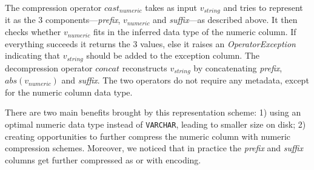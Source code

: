 The compression operator \(cast_{numeric}\) takes as input \(v_{string}\) and tries to represent it as the 3 components---\textit{prefix}, \(v_{numeric}\) and \textit{suffix}---as described above. It then checks whether \(v_{numeric}\) fits in the inferred data type of the numeric column. If everything succeeds it returns the 3 values, else it raises an \textit{OperatorException} indicating that \(v_{string}\) should be added to the exception column. The decompression operator \(concat\) reconstructs \(v_{string}\) by concatenating \textit{prefix}, \(abs(v_{numeric})\) and \textit{suffix}. The two operators do not require any metadata, except for the numeric column data type.

There are two main benefits brought by this representation scheme: 1) using an optimal numeric data type instead of \verb|VARCHAR|, leading to smaller size on disk; 2) creating opportunities to further compress the numeric column with numeric compression schemes. Moreover, we noticed that in practice the \textit{prefix} and \textit{suffix} columns get further compressed as  or with  encoding.

